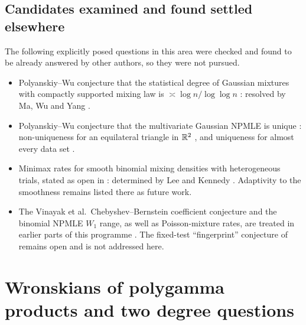 \documentclass[11pt]{amsart}
\theoremstyle{definition}
\theoremstyle{remark}
\begin{document}
\subsection{Candidates examined and found settled elsewhere}
\label{R5:sec:settled}

The following explicitly posed questions in this area were checked and
found to be already answered by other authors, so they were not pursued.
\begin{itemize}
\item Polyanskiy--Wu conjecture that the statistical degree of Gaussian
 mixtures with compactly supported mixing law is $\asymp\log n/\log\log n$
 \cite[Sec.~5.3]{R5-PW20}: resolved by Ma, Wu and Yang \cite{R5-MWY24}.
\item Polyanskiy--Wu conjecture that the multivariate Gaussian NPMLE is
 unique \cite[Sec.~5.6]{R5-PW20}: non-uniqueness for an equilateral
 triangle in $\mathbb{R}^2$ \cite[Lemma~2]{R5-SGS25}, and uniqueness for almost
 every data set \cite{R5-Wang26}.
\item Minimax rates for smooth binomial mixing densities with heterogeneous
 trials, stated as open in \cite[Sec.~2.3, Sec.~6]{R5-LBK25}: determined
 by Lee and Kennedy \cite{R5-LK26}.  Adaptivity to the smoothness remains
 listed there as future work.
\item The Vinayak et al.\ Chebyshev--Bernstein coefficient conjecture and
 the binomial NPMLE $W_1$ range, as well as Poisson-mixture rates, are
 treated in earlier parts of this programme \cite{K-029}.  The
 fixed-test ``fingerprint'' conjecture of \cite[Sec.~5.1]{R5-VKVK19} remains
 open and is not addressed here.
\end{itemize}


\providecommand{\RtwoL}{\mathcal{L}}
\providecommand{\Rtwodeg}{\operatorname{deg}_{\mathrm{cm}}}
\providecommand{\RtwoB}{\operatorname{B}}

\section{Wronskians of polygamma products and two degree questions}
\label{R2:sec}
\end{document}
